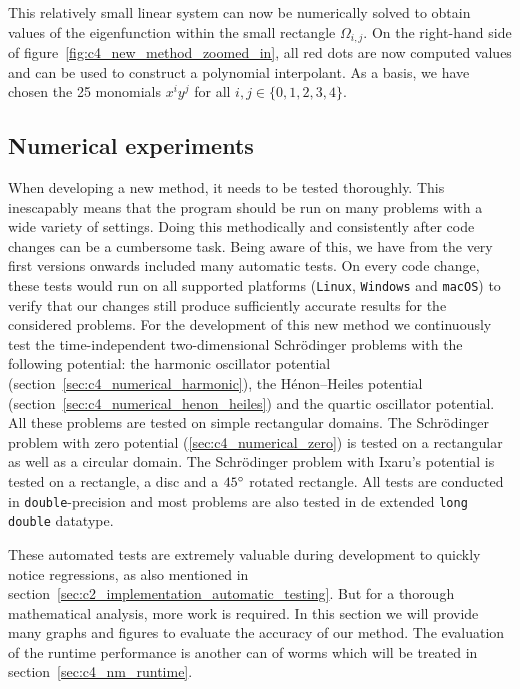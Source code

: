 This relatively small linear system can now be numerically solved to obtain values of the eigenfunction within the small rectangle $\Omega_{i,j}$. On the right-hand side of figure~\ref{fig:c4_new_method_zoomed_in}, all red dots are now computed values and can be used to construct a polynomial interpolant. As a basis, we have chosen the 25 monomials $x^i y^j$ for all $i,j \in \{0,1,2,3,4\}$.

\subsection{Numerical experiments}\label{sec:c4_numerical_experiments}

When developing a new method, it needs to be tested thoroughly. This inescapably means that the program should be run on many problems with a wide variety of settings. Doing this methodically and consistently after code changes can be a cumbersome task. Being aware of this, we have from the very first versions onwards included many automatic tests. On every code change, these tests would run on all supported platforms (\texttt{Linux}, \texttt{Windows} and \texttt{macOS}) to verify that our changes still produce sufficiently accurate results for the considered problems. For the development of this new method we continuously test the time-independent two-dimensional Schrödinger problems with the following potential: the harmonic oscillator potential (section~\ref{sec:c4_numerical_harmonic}), the Hénon--Heiles potential (section~\ref{sec:c4_numerical_henon_heiles}) and the quartic oscillator potential. All these problems are tested on simple rectangular domains. The Schrödinger problem with zero potential (\ref{sec:c4_numerical_zero}) is tested on a rectangular as well as a circular domain. The Schrödinger problem with Ixaru's potential is tested on a rectangle, a disc and a $45\degree$ rotated rectangle. All tests are conducted in \texttt{double}-precision and most problems are also tested in de extended \texttt{long double} datatype.

These automated tests are extremely valuable during development to quickly notice regressions, as also mentioned in section~\ref{sec:c2_implementation_automatic_testing}. But for a thorough mathematical analysis, more work is required. In this section we will provide many graphs and figures to evaluate the accuracy of our method. The evaluation of the runtime performance is another can of worms which will be treated in section~\ref{sec:c4_nm_runtime}.

